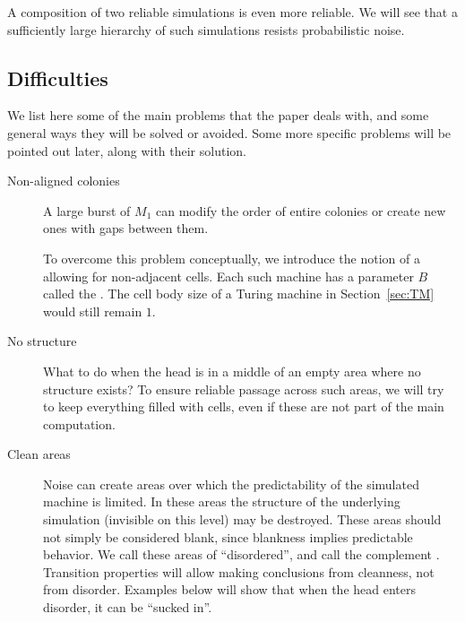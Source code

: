 \documentclass[11pt]{memoir}
\theoremstyle{definition} %
\def\B{B}
\begin{document}
A composition of two reliable simulations is even more reliable.
We will see that a sufficiently large hierarchy of such
simulations resists probabilistic noise.

\subsection{Difficulties}\label{sec:novelties}

We list here some of the main problems that the paper deals with, 
and some general ways they will be solved or avoided.
Some more specific problems will be pointed out later, along with their solution.

\begin{description}

\item[Non-aligned colonies] A large burst of \( M_{1} \) can modify the order of
entire colonies or create new ones with gaps between them.

To overcome this problem conceptually, we 
introduce the notion of a 
allowing for non-adjacent cells.
Each such machine has a parameter \( \B \) called the .
The cell body size of a Turing machine in Section~\ref{sec:TM} would still remain
\( 1 \).

    \item[No structure] What to do when the head is in a middle of an empty area
       where no structure exists?
To ensure reliable passage across such areas,
we will try to keep everything filled with cells, even if these are
not part of the main computation.

\item[Clean areas]
    Noise can create areas over
which the predictability of the simulated machine is limited.
In these areas the structure
of the underlying simulation (invisible on this level) may be destroyed.
These areas should not simply be considered blank, since
blankness implies predictable behavior.
We call these areas of  ``disordered'', and call the complement .
Transition properties will allow making conclusions from cleanness, not from disorder.
Examples below will show that when the head enters disorder, it can be ``sucked in''.


\end{description}
\end{document}
